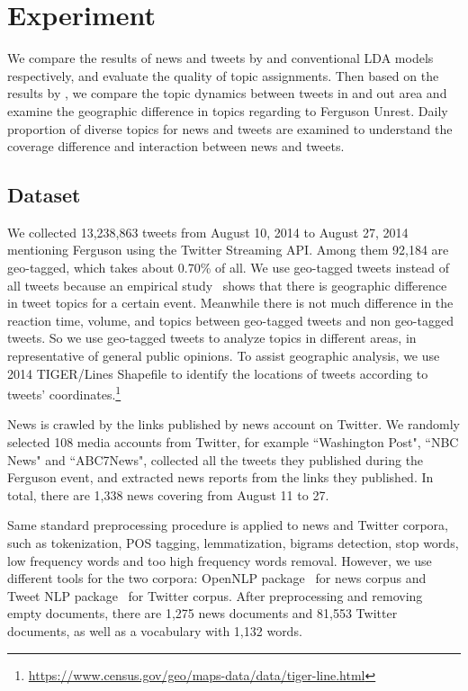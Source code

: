 \section{Experiment}
\label{sec:exp}

We compare the results of news and tweets by \stlda and conventional LDA models respectively, and evaluate the quality of topic assignments. Then based on the results by \stlda, we compare the topic dynamics between tweets in and out \stlouis area and examine the geographic difference in topics regarding to Ferguson Unrest. Daily proportion of diverse topics for news and tweets are examined to understand the coverage difference and interaction between news and tweets.

\subsection{Dataset}

We collected 13,238,863 tweets from August 10, 2014 to August 27, 2014 mentioning Ferguson using the Twitter Streaming API. Among them 92,184 are geo-tagged, which takes about 0.70\% of all. We use geo-tagged tweets instead of all tweets because an empirical study~\cite{he2015uncovering} shows that there is geographic difference in tweet topics for a certain event. Meanwhile there is not much difference in the reaction time, volume, and topics between geo-tagged tweets and non geo-tagged tweets. So we use geo-tagged tweets to analyze topics in different areas, in representative of general public opinions. To assist geographic analysis, we use 2014 TIGER/Lines Shapefile to identify the locations of tweets according to tweets' coordinates.\footnote{\url{https://www.census.gov/geo/maps-data/data/tiger-line.html}}

News is crawled by the links published by news account on Twitter. We randomly selected 108 media accounts from Twitter, for example ``Washington Post", ``NBC News" and ``ABC7News", collected all the tweets they published during the Ferguson event, and extracted news reports from the links they published. In total, there are 1,338 news covering from August 11 to 27.

Same standard preprocessing procedure is applied to news and Twitter corpora, such as tokenization, POS tagging, lemmatization, bigrams detection, stop words, low frequency words and too high frequency words removal. However, we use different tools for the two corpora: OpenNLP package~\cite{baldridge2005opennlp} for news corpus and Tweet NLP package~\cite{owoputi2013improved} for Twitter corpus. After preprocessing and removing empty documents, there are 1,275 news documents and 81,553 Twitter documents, as well as a vocabulary with 1,132 words.

